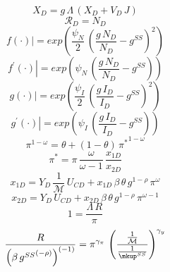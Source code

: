 \documentclass[10pt,a4paper]{article}
\begin{document}
\begin{dmath}
{X_D}={g}\, {\Lambda}\, \left({X_D}+{V_D}\, {J}\right)
\end{dmath}
\begin{dmath}
{\mathcal{R}_{D}}={N_D}
\end{dmath}
\begin{dmath}
{\left.       f\left( \cdot \right)            \right|}=exp\left(\frac{{\psi_N}}{2}\, \left(\frac{{g}\, {N_D}}{{N_D}}-{g^{SS}}\right)^{2}\right)
\end{dmath}
\begin{dmath}
{\left.       f^{\prime}\left( \cdot \right)   \right|}=exp\left({\psi_N}\, \left(\frac{{g}\, {N_D}}{{N_D}}-{g^{SS}}\right)\right)
\end{dmath}
\begin{dmath}
{\left.       g\left( \cdot \right)            \right|}=exp\left(\frac{{\psi_I}}{2}\, \left(\frac{{g}\, {I_D}}{{I_D}}-{g^{SS}}\right)^{2}\right)
\end{dmath}
\begin{dmath}
{\left.       g^{\prime}\left( \cdot \right)   \right|}=exp\left({\psi_I}\, \left(\frac{{g}\, {I_D}}{{I_D}}-{g^{SS}}\right)\right)
\end{dmath}
\begin{dmath}
{\pi}^{1-{\omega}}={\theta}+\left(1-{\theta}\right)\, {\pi^*}^{1-{\omega}}
\end{dmath}
\begin{dmath}
{\pi^*}={\pi}\, \frac{{\omega}}{{\omega}-1}\, \frac{{x_{1D}}}{{x_{2D}}}
\end{dmath}
\begin{dmath}
{x_{1D}}={Y_D}\, \frac{1}{{\mathcal{M}}}\, {U_{CD}}+{x_{1D}}\, \beta\, {\theta}\, {g}^{1-\rho}\, {\pi}^{{\omega}}
\end{dmath}
\begin{dmath}
{x_{2D}}={Y_D}\, {U_{CD}}+{x_{2D}}\, \beta\, {\theta}\, {g}^{1-\rho}\, {\pi}^{{\omega}-1}
\end{dmath}
\begin{dmath}
1=\frac{{\Lambda}\, {R}}{{\pi}}
\end{dmath}
\begin{dmath}
\frac{{R}}{\left(\beta\, {g^{SS}}^{\left(-\rho\right)}\right)^{\left(-1\right)}}={\pi}^{{{\gamma}_{\pi}}}\, \left(\frac{\frac{1}{{\mathcal{M}}}}{\frac{1}{{\mkup^{SS}}}}\right)^{{{\gamma}_{y}}}
\end{dmath}
\end{document}

